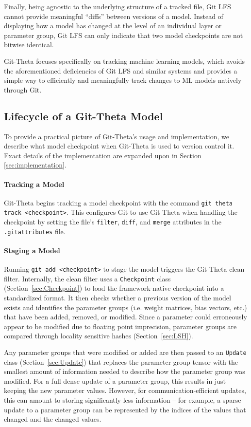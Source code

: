 \documentclass[nohyperref]{article}
\def\code#1{\texttt{#1}}
\theoremstyle{plain}
\theoremstyle{definition}
\theoremstyle{remark}
\begin{document}
Finally, being agnostic to the underlying structure of a tracked file, Git LFS cannot provide meaningful ``diffs'' between versions of a model. Instead of displaying how a model has changed at the level of an individual layer or parameter group, Git LFS can only indicate that two model checkpoints are not bitwise identical.

Git-Theta focuses specifically on tracking machine learning models, which avoids the aforementioned deficiencies of Git LFS and similar systems and provides a simple way to efficiently and meaningfully track changes to ML models natively through Git. 

\subsection{Lifecycle of a Git-Theta Model}
To provide a practical picture of Git-Theta's usage and implementation, we describe what model checkpoint when Git-Theta is used to version control it. Exact details of the implementation are expanded upon in Section \ref{sec:implementation}.

\paragraph{Tracking a Model}
Git-Theta begins tracking a model checkpoint with the command \code{git theta track <checkpoint>}. This configures Git to use Git-Theta when handling the checkpoint by setting the file's \code{filter}, \code{diff}, and \code{merge} attributes in the \code{.gitattributes} file. 

\paragraph{Staging a Model}
Running \code{git add <checkpoint>} to stage the model triggers the Git-Theta clean filter. Internally, the clean filter uses a \code{Checkpoint} class (Section~\ref{sec:Checkpoint}) to load the framework-native checkpoint into a standardized format. It then checks whether a previous version of the model exists and identifies the parameter groups (i.e. weight matrices, bias vectors, etc.) that have been added, removed, or modified. Since a parameter could erroneously appear to be modified due to floating point imprecision, parameter groups are compared through locality sensitive hashes (Section~\ref{sec:LSH}).

Any parameter groups that were modified or added are then passed to an \code{Update} class (Section~\ref{sec:Update}) that replaces the parameter group tensor with the smallest amount of information needed to describe how the parameter group was modified. For a full dense update of a parameter group, this results in just keeping the new parameter values. However, for communication-efficient updates, this can amount to storing significantly less information -- for example, a sparse update to a parameter group can be represented by the indices of the values that changed and the changed values.
\end{document}
